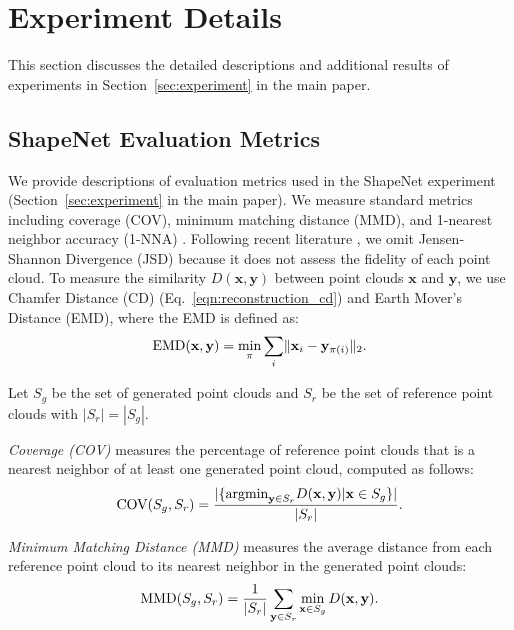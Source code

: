 \documentclass[final]{arxiv/cvpr}
\begin{document}
\section{Experiment Details}
This section discusses the detailed descriptions and additional results of experiments in Section~\ref{sec:experiment} in the main paper.

\subsection{ShapeNet Evaluation Metrics}
\label{appendix:metrics}
We provide descriptions of evaluation metrics used in the ShapeNet experiment (Section~\ref{sec:experiment} in the main paper).
We measure standard metrics including coverage (COV), minimum matching distance (MMD), and 1-nearest neighbor accuracy (1-NNA) \cite{achlioptas2018learning, yang2019pointflow}.
Following recent literature \cite{kim2020softflow}, we omit Jensen-Shannon Divergence (JSD) \cite{achlioptas2018learning} because it does not assess the fidelity of each point cloud. To measure the similarity $D(\mathbf{x}, \mathbf{y})$ between point clouds $\mathbf{x}$ and $\mathbf{y}$, we use Chamfer Distance (CD) (Eq.~\eqref{eqn:reconstruction_cd}) and Earth Mover's Distance (EMD), where the EMD is defined as:
\begin{align}
    \textnormal{EMD}(\mathbf{x}, \mathbf{y}) = \min_{\pi} {\sum_i}{\| \mathbf{x}_i - \mathbf{y}_{\pi(i)}\|_2}.
\end{align}

Let $S_g$ be the set of generated point clouds and $S_r$ be the set of reference point clouds with $|S_r| = |S_g|$.

\emph{Coverage (COV)} measures the percentage of reference point clouds that is a nearest neighbor of at least one generated point cloud, computed as follows:
\begin{equation}
    \textnormal{COV}(S_g, S_r) = \frac{|\{\textnormal{argmin}_{\mathbf{y}\in S_r}D(\mathbf{x}, \mathbf{y})|\mathbf{x}\in S_g\}|}{|S_r|}.
\end{equation}

\emph{Minimum Matching Distance (MMD)} measures the average distance from each reference point cloud to its nearest neighbor in the generated point clouds:
\begin{equation}
    \textnormal{MMD}(S_g, S_r) = \frac{1}{|S_r|}\sum_{\mathbf{y}\in S_r}{\min_{\mathbf{x}\in S_g}{D(\mathbf{x}, \mathbf{y})}}.
\end{equation}
\end{document}
